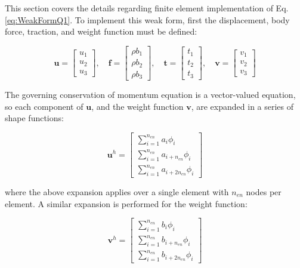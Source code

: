\documentclass[10pt]{article}
\begin{document}
This section covers the details regarding finite element implementation of Eq. \eqref{eq:WeakFormQ1}. To implement this weak form, first the displacement, body force, traction, and weight function must be defined:

\begin{equation}
\textbf{u}=\begin{bmatrix}u_1\\u_2\\u_3\end{bmatrix},\quad\textbf{f}=\begin{bmatrix}\rho b_1\\\rho b_2\\\rho b_3\end{bmatrix},\quad\textbf{t}=\begin{bmatrix}t_1\\t_2\\t_3\end{bmatrix},\quad\textbf{v}=\begin{bmatrix}v_1\\v_2\\v_3\end{bmatrix}
\end{equation}

The governing conservation of momentum equation is a vector-valued equation, so each component of \(\textbf{u}\), and the weight function \(\textbf{v}\), are expanded in a series of shape functions:

\begin{equation}
\label{eq:UExpansion}
\textbf{u}^h=\begin{bmatrix}\sum_{i=1}^{n_{en}}a_i\phi_i\\\sum_{i=1}^{n_{en}}a_{i+n_{en}}\phi_i\\\sum_{i=1}^{n_{en}}a_{i+2n_{en}}\phi_i\end{bmatrix}
\end{equation}

where the above expansion applies over a single element with \(n_{en}\) nodes per element. A similar expansion is performed for the weight function:

\begin{equation}
\textbf{v}^h=\begin{bmatrix}\sum_{i=1}^{n_{en}}b_i\phi_i\\\sum_{i=1}^{n_{en}}b_{i+n_{en}}\phi_i\\\sum_{i=1}^{n_{en}}b_{i+2n_{en}}\phi_i\end{bmatrix}
\end{equation}
\end{document}
